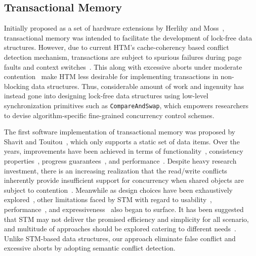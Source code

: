 \documentclass[10pt,conference,compsocconf]{IEEEtran}
\begin{document}
\subsection{Transactional Memory}
Initially proposed as a set of hardware extensions by Herlihy and Moss~\cite{herlihy1993transactional}, transactional memory was intended to facilitate the development of lock-free data structures.
However, due to current HTM's cache-coherency based conflict detection mechanism, transactions are subject to spurious failures during page faults and context switches~\cite{dice2009early}.
This along with excessive aborts under moderate contention~\cite{christina2015resource} make HTM less desirable for implementing transactions in non-blocking data structures.
Thus, considerable amount of work and ingenuity has instead gone into designing lock-free data structures using low-level synchronization primitives such as \texttt{CompareAndSwap}, which empowers researchers to devise algorithm-specific fine-grained concurrency control schemes.

The first software implementation of transactional memory was proposed by Shavit and Touitou~\cite{shavit1997software}, which only supports a static set of data items.
Over the years, improvements have been achieved in terms of functionality~\cite{herlihy2003software}, consistency properties~\cite{guerraoui2008correctness}, progress guarantees~\cite{marathe2006lowering}, and performance~\cite{saha2006mcrt,dice2006transactional}. 
Despite heavy research investment, there is an increasing realization that the read/write conflicts inherently provide insufficient support for concurrency when shared objects are subject to contention~\cite{koskinen2010coarse}.
Meanwhile as design choices have been exhaustively explored~\cite{marathe2004qualitative,marathe2004design}, other limitations faced by STM with regard to usability~\cite{Rossbach2010transactional}, performance~\cite{cascaval2008software}, and expressiveness~\cite{guerraoui2008obstruction} also began to surface.
It has been suggested that STM may not deliver the promised efficiency and simplicity for all scenario, and multitude of approaches should be explored catering to different needs~\cite{attiya2010inherent}.
Unlike STM-based data structures, our approach eliminate false conflict and excessive aborts by adopting semantic conflict detection.
\end{document}
